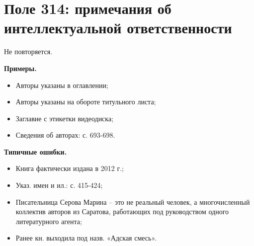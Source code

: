 \chapter{Поле 314: примечания об интеллектуальной ответственности}

Не повторяется.

\textbf{Примеры.}

\begin{itemize}
	\item Авторы указаны в оглавлении;
	\item Авторы указаны на обороте титульного листа;
	\item Заглавие с этикетки видеодиска;
	\item Сведения об авторах: с. 693-698.
\end{itemize}

\textbf{Типичные ошибки.}

\begin{itemize}
	\item Книга фактически издана в 2012 г.;
	\item Указ. имен и ил.: с. 415-424;
	\item Писательница Серова Марина -- это не реальный человек, а многочисленный коллектив авторов из Саратова, работающих под руководством одного литературного агента;
	\item Ранее кн. выходила под назв. «Адская смесь».
\end{itemize}
